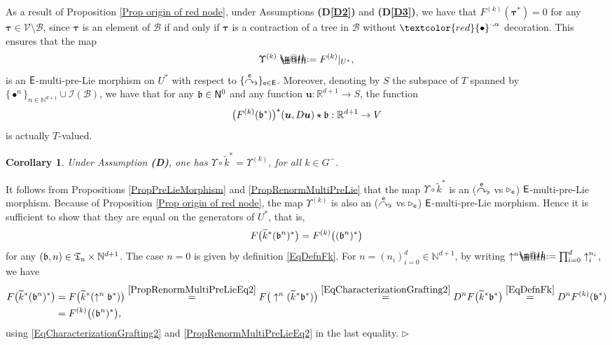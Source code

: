 \documentclass[10pt, reqno]{amsart}
\makeatletter
\numberwithin{subsection}{section}
\numberwithin{subsubsection}{subsection}
\numberwithin{equation}{section} %
\newenvironment{Dem}[1][\unskip]{%
    \begin{list}{\hspace{1.15cm}{\sf \textbf{{\small Proof #1 --}}}}{%
        \setlength{\topsep}{0pt}%
        \setlength{\leftmargin}{0pt}%
        \setlength{\rightmargin}{0pt}%
        \setlength{\listparindent}{0pt}%
        \setlength{\itemindent}{0pt}%
        \setlength{\parsep}{0pt}%
        \addtolength{\leftmargin}{0pt}%
        \addtolength{\rightmargin}{0pt}%
    } \item }{\hfill $\rhd$\end{list}\smallskip}
\theoremstyle{mystyle}
\newtheorem{cor}[thm]{\hspace{-0.15cm}  {Corollary} }%
\theoremstyle{mystyle2}
\theoremstyle{mystyle3}
\newcommand{\refD}[1]{\textbf{\textsf{(D\ref{#1})}}}
\newcommand{\REFD}{\textbf{\textsf{(D)}}}
\newcommand{\bsu}{\boldsymbol{u}}
\newcommand{\bstau}{\boldsymbol{\tau}}
\newcommand{\flatgrafting}{\overset{\sf e}{\curvearrowright}_{\flat}}
\newcommand\bbN{\mathbb{N}}
\newcommand\bbR{\mathbb{R}}
\newcommand{\mcB}{\mathcal{B}}
\newcommand{\mcI}{\mathcal{I}}
\newcommand\mcV{\mathcal V}
\newcommand*{\defeq}{\mathrel{\rlap{%
                     \raisebox{0.3ex}{$\m@th\cdot$}}%
                     \raisebox{-0.3ex}{$\m@th\cdot$}}%
                     =}
\makeatother
\begin{document}
\medskip

As a result of Proposition \ref{Prop origin of red node}, under Assumptions \refD{D2} and \refD{D3}, we have that $F^{(k)}(\bstau^*)=0$ for any $\bstau\in\mcV\setminus\mcB$,
since $\bstau$ is an element of $\mcB$ if and only if $\bstau$ is a contraction of a tree in $\mcB$ without $\textcolor{red}{\bullet}^{\cdot,\alpha}$ decoration. This ensures that the map
$$
\Upsilon^{(k)}\defeq F^{(k)}\vert_{U^*},
$$
is an $\sf E$-multi-pre-Lie morphism on $U^*$ with respect to $\{\flatgrafting\}_{\sf e\in E}$.
Moreover, denoting by $S$ the subspace of $T$ spanned by $\{\bullet^n\}_{n\in\bbN^{d+1}}\cup\mcI(\mcB)$,
we have that for any $\frak{b}\in{\sf N}^0$ and any function $\bsu:\bbR^{d+1}\to S$, the function
$$
\big(F^{(k)}(\frak{b}^*)\big)^\star(\bsu, D\bsu  )\star\frak{b}:\bbR^{d+1}\to V
$$
is actually $T$-valued.

\medskip

\begin{cor}   \label{CorrenormalizedVectorFields}
Under Assumption \REFD, one has $\Upsilon\circ\widetilde{k}^* = \Upsilon^{(k)}$, for all $k\in G^-$.
\end{cor}

\medskip

\begin{Dem} 
It follows from Propositions \ref{PropPreLieMorphism} and \ref{PropRenormMultiPreLie} that the map $\Upsilon\circ\widetilde{k}^*$ is an ($\flatgrafting$ vs $\triangleright_{\sf e}$) $\sf E$-multi-pre-Lie morphism. 
Because of Proposition \ref{Prop origin of red node}, the map $\Upsilon^{(k)}$ is also an ($\flatgrafting$ vs $\triangleright_{\sf e}$) $\sf E$-multi-pre-Lie morphism. Hence it is sufficient to show that they are equal on the generators of $U^*$, that is,
$$
F\big(\widetilde{k}^*(\frak{b}^n)^*\big)=F^{(k)}\big((\frak{b}^n)^*\big)
$$
for any $(\frak{b},n)\in\frak{T}_{\rm n}\times\bbN^{d+1}$. The case $n=0$ is given by definition \eqref{EqDefnFk}. For $n=(n_i)_{i=0}^d\in\bbN^{d+1}$, by writing $\uparrow^n\defeq \prod_{i=0}^d\uparrow_i^{n_i}$, we 
have
\begin{align*}
F\big(\widetilde{k}^*(\frak{b}^n)^*\big)
&=F\big(\widetilde{k}^*(\uparrow^n\frak{b}^*)\big)
\overset{\eqref{PropRenormMultiPreLieEq2}}{=}
F\big(\uparrow^n(\widetilde{k}^*\frak{b}^*)\big)
\overset{\eqref{EqCharacterizationGrafting2}}{=}
D^nF\big(\widetilde{k}^*\frak{b}^*\big)
\overset{\eqref{EqDefnFk}}{=}
D^nF^{(k)}(\frak{b}^*)   \\
&=F^{(k)}\big((\frak{b}^n)^*\big),
\end{align*}
using \eqref{EqCharacterizationGrafting2} and \eqref{PropRenormMultiPreLieEq2} in the last equality.
\end{Dem}
\end{document}
